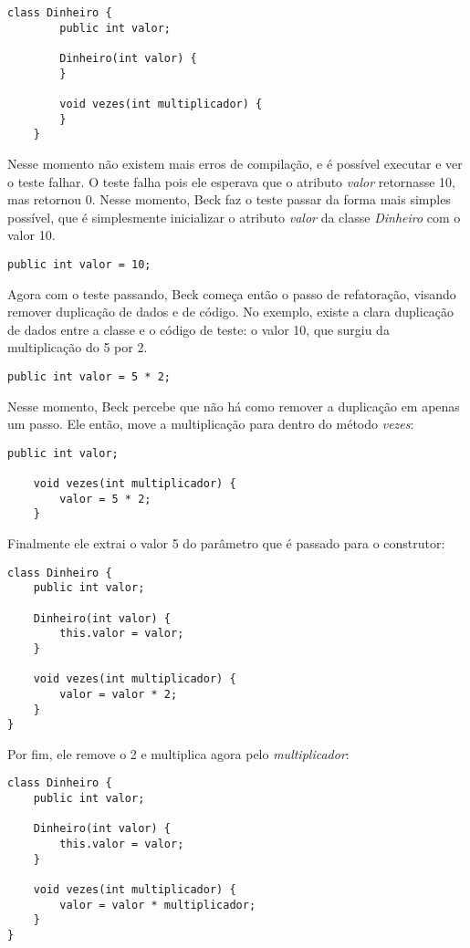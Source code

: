 \begin{lstlisting}[frame=trbl]
	class Dinheiro {
		public int valor;
		
		Dinheiro(int valor) {
		}
		
		void vezes(int multiplicador) {
		}
	}
\end{lstlisting}

Nesse momento não existem mais erros de compilação, e é possível executar e ver o teste falhar. O teste falha pois ele esperava
que o atributo \textit{valor} retornasse 10, mas retornou 0. Nesse momento, Beck faz o teste passar da forma mais simples possível,
que é simplesmente inicializar o atributo \textit{valor} da classe \textit{Dinheiro} com o valor 10.

\begin{lstlisting}[frame=trbl]
	public int valor = 10;
\end{lstlisting}

Agora com o teste passando, Beck começa então o passo de refatoração, visando remover duplicação de dados e de código. No exemplo,
existe a clara duplicação de dados entre a classe e o código de teste: o valor 10, que surgiu da multiplicação do 5 por 2. 

\begin{lstlisting}[frame=trbl]
	public int valor = 5 * 2;
\end{lstlisting}

Nesse momento, Beck percebe que não há como remover a duplicação em apenas um passo. Ele então, move a multiplicação para dentro
do método \textit{vezes}:

\begin{lstlisting}[frame=trbl]
	public int valor;
	
	void vezes(int multiplicador) {
		valor = 5 * 2;
	}
\end{lstlisting}

Finalmente ele extrai o valor 5 do parâmetro que é passado para o construtor:

\begin{lstlisting}[frame=trbl]
class Dinheiro {
	public int valor;
	
	Dinheiro(int valor) {
		this.valor = valor;
	}
	
	void vezes(int multiplicador) {
		valor = valor * 2;
	}
}
\end{lstlisting}

Por fim, ele remove o 2 e multiplica agora pelo \textit{multiplicador}:

\begin{lstlisting}[frame=trbl]
class Dinheiro {
	public int valor;
	
	Dinheiro(int valor) {
		this.valor = valor;
	}
	
	void vezes(int multiplicador) {
		valor = valor * multiplicador;
	}
}
\end{lstlisting}

